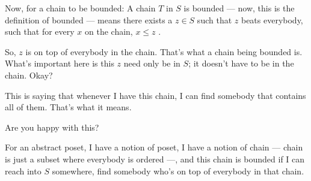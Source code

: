 \begin{content}

\end{content}

\begin{speech}[00:40:43 - 00:42:03]
Now, for a chain to be bounded: A chain $T$ in $S$ is bounded  --- now, this is the definition of bounded --- means there exists a $z \in S$ such that $z$ beats everybody, such that for every $x$ on the chain, $x \le z$ .

So, $z$ is on top of everybody in the chain. That's what a chain being bounded is. What's important here is this $z$ need only be in $S$; it doesn't have to be in the chain. Okay?

This is saying that whenever I have this chain, I can find somebody that contains all of them. That's what it means.

Are you happy with this?

For an abstract poset, I have a notion of poset, I have a notion of chain --- chain is just a subset where everybody is ordered ---, and this chain is bounded if I can reach into $S$ somewhere, find somebody who's on top of everybody in that chain.
\end{speech}

